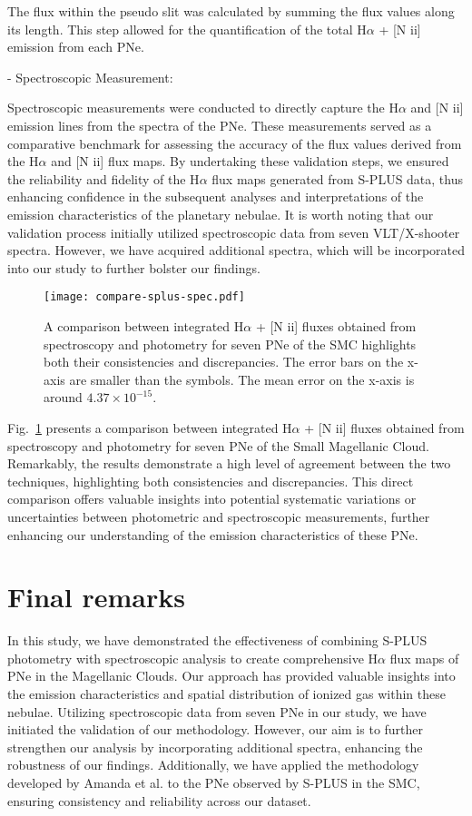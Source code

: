 \documentclass[baaa]{baaa}
\begin{document}
The flux within the pseudo slit was calculated by summing the flux values along its length. This step allowed for the quantification of the total H$\alpha$ + [N {\sc ii}] emission from each PNe.

- Spectroscopic Measurement:

Spectroscopic measurements were conducted to directly capture the H$\alpha$ and [N {\sc ii}] emission lines from the spectra of the PNe. These measurements served as a comparative benchmark for assessing the accuracy of the flux values derived from the H$\alpha$ and [N {\sc ii}] flux maps. By undertaking these validation steps, we ensured the reliability and fidelity of the H$\alpha$ flux maps generated from S-PLUS data, thus enhancing confidence in the subsequent analyses and interpretations of the emission characteristics of the planetary nebulae. It is worth noting that our validation process initially utilized spectroscopic data from seven  VLT/X-shooter spectra. However, we have acquired additional spectra, which will be incorporated into our study to further bolster our findings.

\begin{figure}
\centering
\texttt{[image: compare-splus-spec.pdf]}
\caption{A comparison between integrated H$\alpha$ + [N {\sc ii}] fluxes obtained from spectroscopy and photometry for seven PNe of the SMC highlights both their consistencies and discrepancies. The error bars on the x-axis are smaller than the symbols. The mean error on the x-axis is around $4.37 \times 10^{-15}$.}%
\label{fig:comp}
\end{figure}


Fig.~\ref{fig:comp} presents a comparison between integrated H$\alpha$ + [N {\sc ii}] fluxes obtained from spectroscopy and photometry for seven PNe of the Small Magellanic Cloud. Remarkably, the results demonstrate a high level of agreement between the two techniques, highlighting both consistencies and discrepancies. This direct comparison offers valuable insights into potential systematic variations or uncertainties between photometric and spectroscopic measurements, further enhancing our understanding of the emission characteristics of these PNe.




\section{Final remarks}\label{sec:conclu}

In this study, we have demonstrated the effectiveness of combining S-PLUS photometry with spectroscopic analysis to create comprehensive H$\alpha$ flux maps of PNe in the Magellanic Clouds. Our approach has provided valuable insights into the emission characteristics and spatial distribution of ionized gas within these nebulae. Utilizing spectroscopic data from seven PNe in our study, we have initiated the validation of our methodology. However, our aim is to further strengthen our analysis by incorporating additional spectra, enhancing the robustness of our findings. Additionally, we have applied the methodology developed by Amanda et al. to the PNe observed by S-PLUS in the SMC, ensuring consistency and reliability across our dataset.
\end{document}
